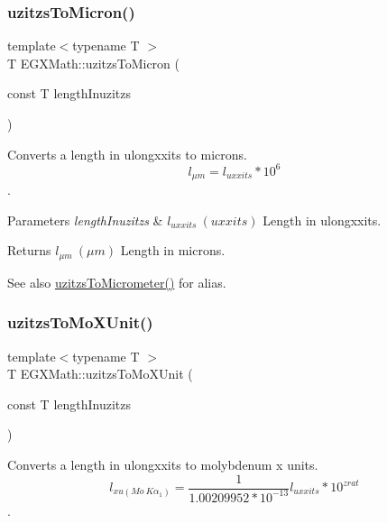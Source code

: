 \subsubsection{\texorpdfstring{uzitzs\+To\+Micron()}{uzitzsToMicron()}}
{\footnotesize\ttfamily template$<$typename T $>$ \\
T E\+G\+X\+Math\+::uzitzs\+To\+Micron (\begin{DoxyParamCaption}\item[{const T}]{length\+Inuzitzs }\end{DoxyParamCaption})}



Converts a length in ulongxxits to microns. \[ l_{\mu m}=l_{uxxits} * 10^{6} \]. 


\begin{DoxyParams}{Parameters}
{\em length\+Inuzitzs} & $ l_{uxxits}\ (uxxits)$ Length in ulongxxits. \\
\hline
\end{DoxyParams}
\begin{DoxyReturn}{Returns}
$ l_{\mu m}\ (\mu m)$ Length in microns. 
\end{DoxyReturn}
\begin{DoxySeeAlso}{See also}
\mbox{\hyperlink{group___e_g_x_math-_conversions-_length_conversions-_non-_s_i-uzitzs-_s_i_ga0bd484a80b8b66cd5272bbbc1fe6b642}{uzitzs\+To\+Micrometer()}} for alias. 
\end{DoxySeeAlso}
\mbox{\label{group___e_g_x_math-_conversions-_length_conversions-_non-_s_i-uzitzs-_non-_s_i_ga64b556911b0bb06cf315aa02f5e2d379}} 
\subsubsection{\texorpdfstring{uzitzs\+To\+Mo\+X\+Unit()}{uzitzsToMoXUnit()}}
{\footnotesize\ttfamily template$<$typename T $>$ \\
T E\+G\+X\+Math\+::uzitzs\+To\+Mo\+X\+Unit (\begin{DoxyParamCaption}\item[{const T}]{length\+Inuzitzs }\end{DoxyParamCaption})}



Converts a length in ulongxxits to molybdenum x units. \[ l_{xu(Mo\ K\alpha_1)}=\frac{1}{1.00209952*10^{-13}} l_{uxxits} * 10^{zrat}\]. 


